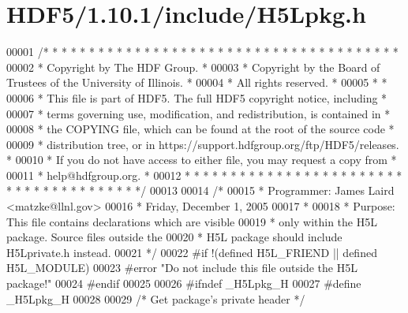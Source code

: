 \hypertarget{_h_d_f5_21_810_81_2include_2_h5_lpkg_8h_source}{}\section{H\+D\+F5/1.10.1/include/\+H5\+Lpkg.h}
\label{_h_d_f5_21_810_81_2include_2_h5_lpkg_8h_source}

\begin{DoxyCode}
00001 \textcolor{comment}{/* * * * * * * * * * * * * * * * * * * * * * * * * * * * * * * * * * * * * * *}
00002 \textcolor{comment}{ * Copyright by The HDF Group.                                               *}
00003 \textcolor{comment}{ * Copyright by the Board of Trustees of the University of Illinois.         *}
00004 \textcolor{comment}{ * All rights reserved.                                                      *}
00005 \textcolor{comment}{ *                                                                           *}
00006 \textcolor{comment}{ * This file is part of HDF5.  The full HDF5 copyright notice, including     *}
00007 \textcolor{comment}{ * terms governing use, modification, and redistribution, is contained in    *}
00008 \textcolor{comment}{ * the COPYING file, which can be found at the root of the source code       *}
00009 \textcolor{comment}{ * distribution tree, or in https://support.hdfgroup.org/ftp/HDF5/releases.  *}
00010 \textcolor{comment}{ * If you do not have access to either file, you may request a copy from     *}
00011 \textcolor{comment}{ * help@hdfgroup.org.                                                        *}
00012 \textcolor{comment}{ * * * * * * * * * * * * * * * * * * * * * * * * * * * * * * * * * * * * * * */}
00013 
00014 \textcolor{comment}{/*}
00015 \textcolor{comment}{ * Programmer: James Laird <matzke@llnl.gov>}
00016 \textcolor{comment}{ *             Friday, December 1, 2005}
00017 \textcolor{comment}{ *}
00018 \textcolor{comment}{ * Purpose:     This file contains declarations which are visible}
00019 \textcolor{comment}{ *              only within the H5L package. Source files outside the}
00020 \textcolor{comment}{ *              H5L package should include H5Lprivate.h instead.}
00021 \textcolor{comment}{ */}
00022 \textcolor{preprocessor}{#if !(defined H5L\_FRIEND || defined H5L\_MODULE)}
00023 \textcolor{preprocessor}{#error "Do not include this file outside the H5L package!"}
00024 \textcolor{preprocessor}{#endif}
00025 
00026 \textcolor{preprocessor}{#ifndef \_H5Lpkg\_H}
00027 \textcolor{preprocessor}{#define \_H5Lpkg\_H}
00028 
00029 \textcolor{comment}{/* Get package's private header */}

\end{DoxyCode}
